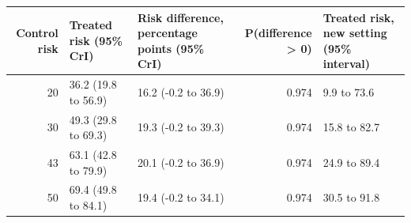 
\begin{tabular}{rllrl}
\toprule
Control risk & Treated risk (95\% CrI) & Risk difference, percentage points (95\% CrI) & P(difference > 0) & Treated risk, new setting (95\% interval)\\
\midrule
20 & 36.2 (19.8 to 56.9) & 16.2 (-0.2 to 36.9) & 0.974 & 9.9 to 73.6\\
30 & 49.3 (29.8 to 69.3) & 19.3 (-0.2 to 39.3) & 0.974 & 15.8 to 82.7\\
43 & 63.1 (42.8 to 79.9) & 20.1 (-0.2 to 36.9) & 0.974 & 24.9 to 89.4\\
50 & 69.4 (49.8 to 84.1) & 19.4 (-0.2 to 34.1) & 0.974 & 30.5 to 91.8\\
\bottomrule
\end{tabular}
